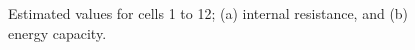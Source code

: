 \documentclass[10pt,twocolumn]{IEEEtran}
\begin{document}
%
%
  
\begin{figure}
\centering
\vspace{-0.2cm}
{} \vspace{-0.1cm}
\caption{Estimated values for  cells 1 to 12;  (a) internal resistance, and (b) energy capacity.}
\vspace{-0.3cm}
\label{fig:cell_removal1}
\end{figure}
\end{document}
